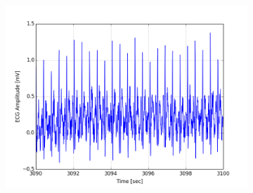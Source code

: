 \documentclass[paper=a4, fontsize=11pt]{scrartcl}
\numberwithin{equation}{section}		%
\numberwithin{figure}{section}			%
\numberwithin{table}{section}		    %
\begin{document}
\begin{appendices}
\begin{figure}[H]
\begin{subfigure}[b]{0.3\textwidth}
		\includegraphics[width=\textwidth]{sim/ecg_63}
	\end{subfigure}
\end{figure}


\end{appendices}
\end{document}
